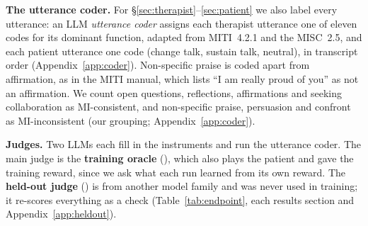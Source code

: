 \textbf{The utterance coder.} For \S\ref{sec:therapist}--\ref{sec:patient} we also label every
utterance: an LLM \emph{utterance
coder} assigns each therapist utterance one of eleven codes for its dominant function, adapted from
MITI~4.2.1 and the MISC~2.5, and each patient utterance one code (change talk, sustain talk,
neutral), in transcript order (Appendix~\ref{app:coder}).
Non-specific praise is coded apart from affirmation, as in the MITI manual, which lists ``I am
really proud of you'' as not an affirmation. We count open questions,
reflections, affirmations and seeking collaboration as MI-consistent, and non-specific praise,
persuasion and confront as MI-inconsistent (our grouping; Appendix~\ref{app:coder}).

\textbf{Judges.} Two LLMs each fill in the instruments and run the utterance coder. The main judge
is the \textbf{training oracle} (\primaryjudge), which also plays the patient and gave the training
reward, since we ask what each run learned from its own reward. The \textbf{held-out judge}
(\heldoutjudge) is from another model family and was never used in training; it re-scores
everything as a check (Table~\ref{tab:endpoint}, each results section and Appendix~\ref{app:heldout}).

